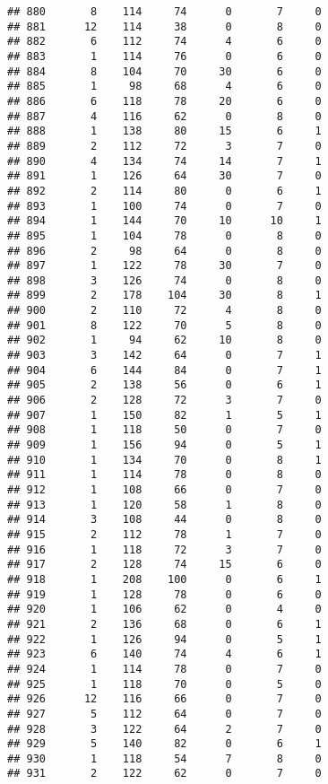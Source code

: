 \documentclass[
]{article}
\begin{document}
\begin{verbatim}
## 880       8    114     74      0       7     0
## 881      12    114     38      0       8     0
## 882       6    112     74      4       6     0
## 883       1    114     76      0       6     0
## 884       8    104     70     30       6     0
## 885       1     98     68      4       6     0
## 886       6    118     78     20       6     0
## 887       4    116     62      0       8     0
## 888       1    138     80     15       6     1
## 889       2    112     72      3       7     0
## 890       4    134     74     14       7     1
## 891       1    126     64     30       7     0
## 892       2    114     80      0       6     1
## 893       1    100     74      0       7     0
## 894       1    144     70     10      10     1
## 895       1    104     78      0       8     0
## 896       2     98     64      0       8     0
## 897       1    122     78     30       7     0
## 898       3    126     74      0       8     0
## 899       2    178    104     30       8     1
## 900       2    110     72      4       8     0
## 901       8    122     70      5       8     0
## 902       1     94     62     10       8     0
## 903       3    142     64      0       7     1
## 904       6    144     84      0       7     1
## 905       2    138     56      0       6     1
## 906       2    128     72      3       7     0
## 907       1    150     82      1       5     1
## 908       1    118     50      0       7     0
## 909       1    156     94      0       5     1
## 910       1    134     70      0       8     1
## 911       1    114     78      0       8     0
## 912       1    108     66      0       7     0
## 913       1    120     58      1       8     0
## 914       3    108     44      0       8     0
## 915       2    112     78      1       7     0
## 916       1    118     72      3       7     0
## 917       2    128     74     15       6     0
## 918       1    208    100      0       6     1
## 919       1    128     78      0       6     0
## 920       1    106     62      0       4     0
## 921       2    136     68      0       6     1
## 922       1    126     94      0       5     1
## 923       6    140     74      4       6     1
## 924       1    114     78      0       7     0
## 925       1    118     70      0       5     0
## 926      12    116     66      0       7     0
## 927       5    112     64      0       7     0
## 928       3    122     64      2       7     0
## 929       5    140     82      0       6     1
## 930       1    118     54      7       8     0
## 931       2    122     62      0       7     0

\end{verbatim}
\end{document}
